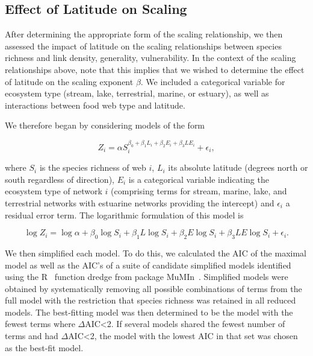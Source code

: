 \documentclass[12pt]{article}
\begin{document}
  \subsection*{Effect of Latitude on Scaling}


    After determining the appropriate form of the scaling relationship, we
    then assessed the impact of latitude on the scaling relationships between
    species richness and  link density, generality, vulnerability. In the
    context of the scaling relationships above, note  that this implies that
    we wished to determine the effect of latitude on the scaling exponent
    $\beta$. We included a categorical variable for
    ecosystem type (stream, lake,  terrestrial, marine, or estuary), as well
    as interactions between food web type and latitude.


    We therefore began by considering models of the form

    \begin{equation}
    \label{PowerLat}
    Z_{i}=\alpha S_{i}^{\beta_{0}+\beta_{1}L_{i}+\beta_{2}E_{i}+\beta_{3}LE_{i}} + \epsilon_{i} ,
    \end{equation}

    \noindent where $S_{i}$ is the species richness of web $i$, $L_{i}$ its absolute
    latitude (degrees north or south  regardless of direction), $E_{i}$ is a categorical
    variable indicating the ecosystem type of network $i$ (comprising terms for stream, 
    marine, lake, and terrestrial networks with estuarine
    networks providing the intercept) and $\epsilon_{i}$ a residual error term.
    The logarithmic formulation of this model is

    \begin{equation}
    \label{LogLat}
    \log{Z_{i}} = \log{\alpha}+\beta_{0}\log{S_{i}} + \beta_{1}L\log{S_{i}} +\beta_{2}E\log{S_{i}} +\beta_{3}LE\log{S_{i}} +\epsilon_{i} .
    \end{equation}

    We then simplified each model. To do this, we calculated the AIC of the
    maximal model as well as the AIC's of a suite of candidate simplified
    models identified using the R~\citep{R} function dredge from package
    MuMIn~\citep{MuMIn}.  Simplified models were obtained by systematically
    removing all possible combinations  of terms from the full model with the
    restriction that species richness was retained in all reduced models. The
    best-fitting model was then determined to be the model with the fewest
    terms  where $\Delta$AIC\textless2. If several models shared the fewest
    number of terms  and had $\Delta$AIC\textless2, the model with the lowest
    AIC in that set was chosen as the best-fit model.
\end{document}
